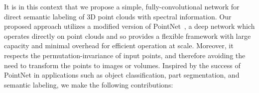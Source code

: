 \documentclass[final,3p,times,twocolumn,authoryear]{elsarticle}
\newcommand{\eg}{\textit{e}.\textit{g}.}
\begin{document}
It is in this context that we propose a simple, fully-convolutional network for direct semantic labeling of 3D point clouds with spectral information. 
Our proposed approach utilizes a modified version of PointNet~\citep{pointnet}, a deep network which operates directly on point clouds and so provides a flexible framework with large capacity and minimal overhead for efficient operation at scale. 
Moreover, it respects the permutation-invariance of input points, and therefore avoiding the need to transform the points to images or volumes. 
Inspired by the success of PointNet in applications such as object classification, part segmentation, and semantic labeling, we make the following contributions:
\end{document}
